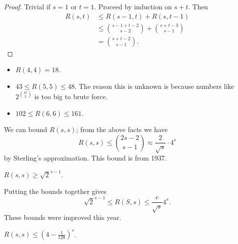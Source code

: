 \documentclass[main.tex]{subfiles}
\begin{document}
\begin{proof}
  Trivial if $s = 1$ or $t = 1$.
  Proceed by induction on $s+t$.
  Then
  \begin{align*}
    R(s,t)&\leq R(s-1,t) + R(s,t-1) \\
          &\leq\binom{s-1+t-2}{s-2} + \binom{s+t-3}{s-1}\tag{inductive hypothesis} \\
          &= \binom{s+t-2}{s-1}. \tag*{\qedhere}
  \end{align*}
\end{proof}
\begin{fact*}
  \listhack
  \begin{itemize}
    \item $R(4,4) = 18$.
    \item $43\leq R(5,5)\leq 48$.
      The reason this is unknown is because numbers like $2^{\binom{45}{2}}$
      is too big to brute force.
    \item $102\leq R(6,6)\leq 161$.
  \end{itemize}
\end{fact*}
We can bound $R(s,s)$; from the above facts we have
\[
  R(s,s)\leq\binom{2s-2}{s-1}\approx\frac{2}{\sqrt s}\cdot 4^s
\]
by Sterling's approximation.
This bound is from 1937.
\begin{proposition}[Erd\H{o}s 1947]
  \th\label{prop:erdos-1947}
  $R(s,s)\geq\sqrt{2}^{s-1}$.
\end{proposition}
Putting the bounds together gives
\[
  \sqrt{2}^{s-1}\leq R(S,s)\leq\frac{c}{\sqrt s}4^s.
\]
These bounds were improved this year.
\begin{theorem}
  $R(s,s)\leq\left(4 - \frac{1}{128}\right)^s$.
\end{theorem}
\end{document}
